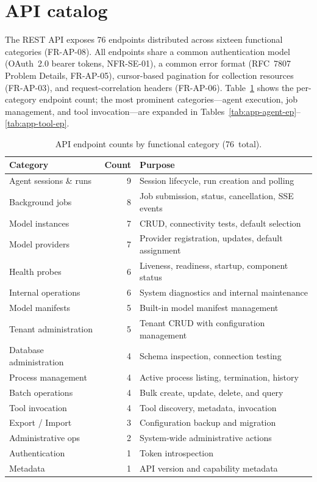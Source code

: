 \documentclass[a4paper]{sapthesis}
\begin{document}
\section{API catalog}
\label{app:api-catalog}

The REST API exposes 76 endpoints distributed across sixteen functional
categories (FR-AP-08).  All endpoints share a common authentication
model (OAuth~2.0 bearer tokens, NFR-SE-01), a common error format
(RFC~7807 Problem Details, FR-AP-05), cursor-based pagination for
collection resources (FR-AP-03), and request-correlation headers
(FR-AP-06).  Table~\ref{tab:app-api-summary} shows the per-category
endpoint count; the most prominent categories---agent execution, job
management, and tool invocation---are expanded in
Tables~\ref{tab:app-agent-ep}--\ref{tab:app-tool-ep}.

\begin{table}[ht]
\centering
\caption{API endpoint counts by functional category (76~total).}
\label{tab:app-api-summary}
\small
\begin{tabularx}{\textwidth}{@{}l r X@{}}
    \hline
    \textbf{Category} & \textbf{Count} & \textbf{Purpose} \\
    \hline
    Agent sessions \& runs  & 9 & Session lifecycle, run creation and polling \\
    Background jobs         & 8 & Job submission, status, cancellation, SSE events \\
    Model instances         & 7 & CRUD, connectivity tests, default selection \\
    Model providers         & 7 & Provider registration, updates, default assignment \\
    Health probes           & 6 & Liveness, readiness, startup, component status \\
    Internal operations     & 6 & System diagnostics and internal maintenance \\
    Model manifests         & 5 & Built-in model manifest management \\
    Tenant administration   & 5 & Tenant CRUD with configuration management \\
    Database administration & 4 & Schema inspection, connection testing \\
    Process management      & 4 & Active process listing, termination, history \\
    Batch operations        & 4 & Bulk create, update, delete, and query \\
    Tool invocation         & 4 & Tool discovery, metadata, invocation \\
    Export / Import         & 3 & Configuration backup and migration \\
    Administrative ops      & 2 & System-wide administrative actions \\
    Authentication          & 1 & Token introspection \\
    Metadata                & 1 & API version and capability metadata \\
    \hline
\end{tabularx}
\end{table}
\end{document}
